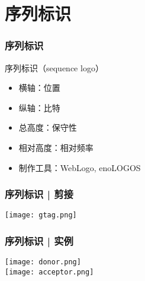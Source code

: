\section{序列标识}
\begin{frame}
	\frametitle{序列标识}
	\begin{block}{序列标识（sequence logo）}
		\begin{itemize}
			\item 横轴：位置
			\item 纵轴：比特
			\item 总高度：保守性
			\item 相对高度：相对频率
			\item 制作工具：WebLogo, enoLOGOS
		\end{itemize}
	\end{block}
\end{frame}

\begin{frame}
	\frametitle{序列标识 | 剪接}
	\begin{center}
		\texttt{[image: gtag.png]}\\
	\end{center}
\end{frame}

\begin{frame}
	\frametitle{序列标识 | 实例}
	\begin{center}
		\texttt{[image: donor.png]}\\
		\texttt{[image: acceptor.png]}
	\end{center}
\end{frame}

